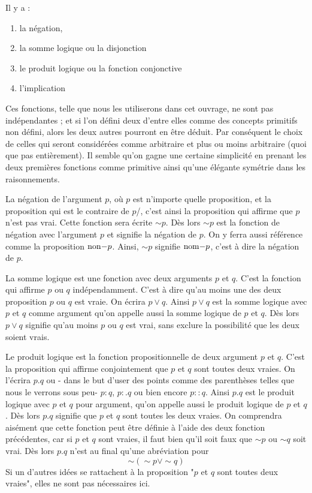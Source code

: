 \documentclass[a4paper]{book}
\begin{document}
Il y a : \begin{enumerate}
\item la négation,
\item la somme logique ou la disjonction
\item le produit logique ou la fonction conjonctive
\item l'implication
\end{enumerate}
Ces fonctions, telle que nous les utiliserons dans cet ouvrage, ne sont pas indépendantes ; et si l'on défini deux d'entre elles comme des concepts primitifs non défini, alors les deux autres pourront en être déduit. Par conséquent le choix de celles qui seront considérées comme arbitraire et plus ou moins arbitraire (quoi que pas entièrement). Il semble qu'on gagne une certaine simplicité en prenant les deux premières fonctions comme primitive ainsi qu'une élégante symétrie dans les raisonnements.

La négation de l'argument $p$, où $p$ est n'importe quelle proposition, et la proposition qui est le contraire de $p$/, c'est ainsi la proposition qui affirme que $p$ n'est pas vrai. Cette fonction sera écrite $\sim p$. Dès lors $\sim p$ est la fonction de négation avec l'argument $p$ et signifie la négation de $p$. On y ferra aussi référence comme la proposition ${\rm non -}p$. Ainsi, $\sim p$ signifie ${\rm nom-}p$, c'est à dire la négation de $p$.

La somme logique est une fonction avec deux arguments $p$ et $q$. C'est la fonction qui affirme $p$ ou $q$ indépendamment. C'est à dire qu'au moins une des deux proposition $p$ ou $q$ est vraie. On écrira $p\lor q $. Ainsi $p\lor q $ est la somme logique avec $p$ et $q$ comme argument qu'on appelle aussi la somme logique de $p$ et $q$. Dès lors $p\lor q $ signifie qu'au moins $p$ ou $q$ est vrai, sans exclure la possibilité que les deux soient vrais.

Le produit logique est la fonction propositionnelle de deux argument $p$ et $q$. C'est la proposition qui affirme conjointement que $p$ et $q$ sont toutes deux vraies. On l'écrira $p.q$ ou - dans le but d'user des points comme des parenthèses telles que nous le verrons sous peu- $p:q$, $p:.q$ ou bien encore $p::q$. Ainsi $p.q$ est le produit logique avec $p$ et $q$ pour argument, qu'on appelle aussi le produit logique de $p$ et $q$. Dès lors $p.q$ signifie que $p$ et $q$ sont toutes les deux vraies. On comprendra aisément que cette fonction peut être définie à l'aide des deux fonction précédentes, car si $p$ et $q$ sont vraies, il faut bien qu'il soit faux que $\sim p$ ou $\sim q$ soit vrai. Dès lors $p.q$ n'est au final qu'une abréviation pour $$\sim(\sim p \lor \sim q)$$ 
Si un d'autres idées se rattachent à la proposition "$p$ et $q$ sont toutes deux vraies", elles ne sont pas nécessaires ici.
\end{document}
